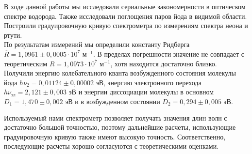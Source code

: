 \documentclass[a4paper, 12pt]{article}%
\begin{document}
\begin{enumerate}
		В ходе данной работы мы исследовали сериальные закономерности в оптическом спектре водорода. Также исследовали поглощения паров йода в видимой области. Построили градуировочную кривую спектрометра по измерениям спектра неона и ртути.\\
		По результатам измерений мы определили константу Ридберга $\overline{R} = 1,0961 \pm 0,0005\cdot 10^7\text{ м}^{-1}$. В пределах погрешности значение не совпадает с теоретическим $ R = 1,0973\cdot 10^7\text{ м}^{-1}$, хотя находится достаточно близко.\\
		Получили энергию колебательного кванта возбужденного состояния молекулы йода $ h \nu_2 = 0,01124 \pm 0,00002 \text{ эВ}$, энергию электронного перехода  $h \nu_{\text{эл}} = 2,121 \pm 0,003 \text{ эВ}$ и энергии диссоциации молекулы в основном $D_1 = 1,470 \pm 0,002\text{ эВ}$ и в возбужденном состоянии $D_2 = 0,294 \pm 0,005\text{ эВ}$.
		
		Используемый нами спектрометр позволяет получать значения длин волн с достаточно большой точностью, поэтому дальнейшие расчеты, использующие градуировочную кривую также имеют высокую точность. Соответственно, последующие расчеты хорошо согласуются с теоретическими оценками. 
		
	
	
	
		

		
	\end{enumerate}
	
\end{document}
